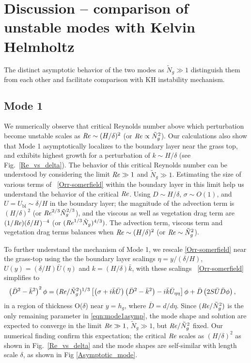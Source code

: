 \documentclass{jfm}
\newcommand{\hg}{h_g}
\newcommand{\Ndg}{\tilde{N}_g}
\newcommand{\ubl}{U_\text{bl}}
\begin{document}
\section{Discussion -- comparison of unstable modes with Kelvin Helmholtz}
The distinct asymptotic behavior of the two modes as $\Ndg \gg 1$ distinguish them from each other and facilitate comparison with KH instability mechanism. 
\subsection{Mode 1}
We numerically observe that critical Reynolds number above which perturbation become unstable scales as  $\mbox{\textit{Re}} \sim (H/\delta)^2$ (or $\Rey \propto {\Ndg}^{2}$). 
Our calculations also show that Mode 1 asymptotically localizes to the boundary layer near the grass top, and exhibits highest growth for a perturbation of  $k \sim H/\delta$ (see Fig.~\ref{Re_vs_delta}). 
The behavior of this critical Reynolds number can be understood by considering the limit $\mbox{\textit{Re}} \gg 1$ and $\Ndg \gg 1$.
Estimating the size of various terms of ~\eqref{Orr-somerfield} within the boundary layer in this limit help us understand the behavior of the critical $\mbox{\textit{Re}}$. 
Using $D\sim H/\delta$, $\sigma \sim O(1)$, and $U=\ubl \sim \delta/H$ in the boundary layer; the magnitude of the advection term is $ (H/\delta)^2$  (or $\Rey^{2/3} \Ndg^{2/3}$), and the viscous as well as vegetation drag term are $(1/\mbox{\textit{Re}}) (\delta/H)^{-4}$ (or $(\Rey^{1/3} \Ndg)^{4/3})$. 
The advection term, viscous term and vegetation drag terms balances when $\mbox{\textit{Re}} \sim (H/\delta)^2$ (or $\Rey \sim {\Ndg}^{2}$).

To further understand the mechanism of Mode 1, we rescale \eqref{Orr-somerfield} near the grass-top using the the boundary layer scalings $\eta = y/(\delta/H)$, 
$U(y) = (\delta/H)\bar{U}(\eta)$ and $k = (H/\delta) \bar{k}$, with these scalings ~\eqref{Orr-somerfield} simplifies to
\begin{equation}
\begin{split}
\left(\bar{D}^2 -\bar{k}^{2} \right)^2\phi &= (\Rey/\Ndg^2)^{1/3} \left[ \left({\sigma}+i\bar{k}\bar{U}\right) \left(\bar{D}^2-\bar{k}^2\right) -i\bar{k}\bar{U}_{\eta\eta}\right]\phi + \bar{D}\left(2S \bar{U} \bar{D} \phi\right),
\label{eqn:mode1asymp}
\end{split}
\end{equation}
in a region of thickness O($\delta$) near $y=\hg$, where $\bar{D} = d/d\eta$. 
Since $(\Rey/\Ndg^2)$ is the only remaining parameter in \eqref{eqn:mode1asymp}, the mode shape and solution are expected to converge in the limit $\mbox{\textit{Re}} \gg 1$, $\Ndg \gg 1$, but $\Rey/\Ndg^2$ fixed.
Our numerical finding confirm this expectation; the critical $\mbox{\textit{Re}}$ scales as $(H/\delta)^2$ as shown in Fig.~\ref{Re_vs_delta} and the mode shapes are self-similar with length scale $\delta$, as shown in Fig \ref{Asymptotic_mode}. 
\end{document}
